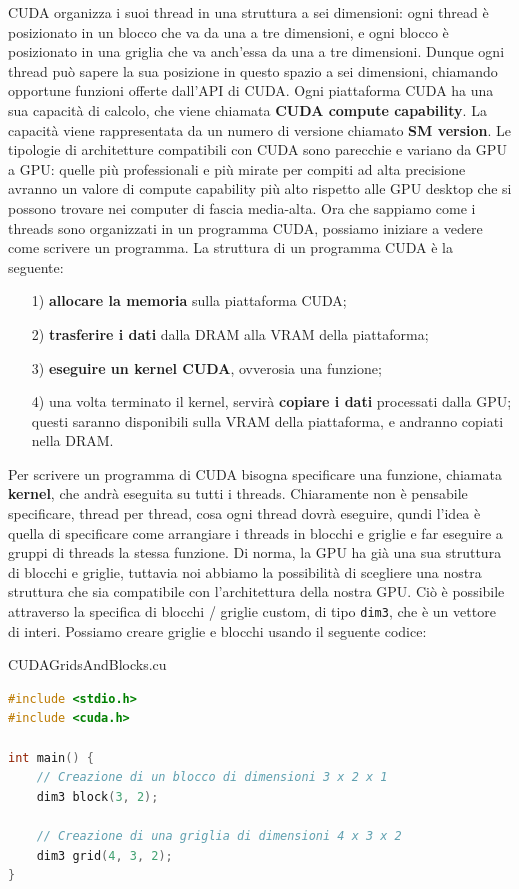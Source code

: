 CUDA organizza i suoi thread in una struttura a sei dimensioni: ogni thread è posizionato in un blocco che va da una a tre dimensioni, e ogni blocco è posizionato in una griglia che va anch'essa da una a tre dimensioni. Dunque ogni thread può sapere la sua posizione in questo spazio a sei dimensioni, chiamando opportune funzioni offerte dall'API di CUDA.
\nwl
Ogni piattaforma CUDA ha una sua capacità di calcolo, che viene chiamata \textbf{CUDA compute capability}. La capacità viene rappresentata da un numero di versione chiamato \textbf{SM version}. Le tipologie di architetture compatibili con CUDA sono parecchie e variano da GPU a GPU: quelle più professionali e più mirate per compiti ad alta precisione avranno un valore di compute capability più alto rispetto alle GPU desktop che si possono trovare nei computer di fascia media-alta. 
\nwl
Ora che sappiamo come i threads sono organizzati in un programma CUDA, possiamo iniziare a vedere come scrivere un programma. La struttura di un programma CUDA è la seguente:
\begin{itemize}
    \item [1)] \textbf{allocare la memoria} sulla piattaforma CUDA;
    \item [2)] \textbf{trasferire i dati} dalla DRAM alla VRAM della piattaforma;
    \item [3)] \textbf{eseguire un kernel CUDA}, ovverosia una funzione;
    \item [4)] una volta terminato il kernel, servirà \textbf{copiare i dati} processati dalla GPU; questi saranno disponibili sulla VRAM della piattaforma, e andranno copiati nella DRAM.
\end{itemize}

Per scrivere un programma di CUDA bisogna specificare una funzione, chiamata \textbf{kernel}, che andrà eseguita su tutti i threads. Chiaramente non è pensabile specificare, thread per thread, cosa ogni thread dovrà eseguire, qundi l'idea è quella di specificare come arrangiare i threads in blocchi e griglie e far eseguire a gruppi di threads la stessa funzione.
\nwl
Di norma, la GPU ha già una sua struttura di blocchi e griglie, tuttavia noi abbiamo la possibilità di scegliere una nostra struttura che sia compatibile con l'architettura della nostra GPU. Ciò è possibile attraverso la specifica di blocchi / griglie custom, di tipo \verb|dim3|, che è un vettore di interi. Possiamo creare griglie e blocchi usando il seguente codice:

\begin{codeblock}{CUDAGridsAndBlocks.cu}
    \begin{lstlisting}[language = C]
#include <stdio.h>
#include <cuda.h>

int main() {
    // Creazione di un blocco di dimensioni 3 x 2 x 1
    dim3 block(3, 2);

    // Creazione di una griglia di dimensioni 4 x 3 x 2
    dim3 grid(4, 3, 2);
}\end{lstlisting}
\end{codeblock}


